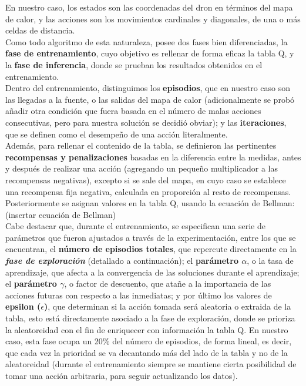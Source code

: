 En nuestro caso, los estados son las coordenadas del dron en términos del mapa de calor, y las acciones son los movimientos cardinales y diagonales, de una o más celdas de distancia.\\

Como todo algoritmo de esta naturaleza, posee dos fases bien diferenciadas, la \textbf{fase de entrenamiento}, cuyo objetivo es rellenar de forma eficaz la tabla Q, y la \textbf{fase de inferencia}, donde se prueban los resultados obtenidos en el entrenamiento.\\

Dentro del entrenamiento, distinguimos los \textbf{episodios}, que en nuestro caso son las llegadas a la fuente, o las salidas del mapa de calor (adicionalmente se probó añadir otra condición que fuera basada en el número de malas acciones consecutivas, pero para nuestra solución se decidió obviar); y las \textbf{iteraciones}, que se definen como el desempeño de una acción literalmente.\\

Además, para rellenar el contenido de la tabla, se definieron las pertinentes \textbf{recompensas y penalizaciones} basadas en la diferencia entre la medidas, antes y después de realizar una acción (agregando un pequeño multiplicador a las recompensas negativas), excepto si se sale del mapa, en cuyo caso se establece una recompensa fija negativa, calculada en proporción al resto de recompensas. Posteriormente se asignan valores en la tabla Q, usando la ecuación de Bellman:\\

(insertar ecuación de Bellman)\\

Cabe destacar que, durante el entrenamiento, se especifican una serie de parámetros que fueron ajustados a través de la experimentación, entre los que se encuentran, el \textbf{número de episodios totales}, que repercute directamente en la \textbf{\emph{fase de exploración}} (detallado a continuación); el \textbf{parámetro $\alpha$}, o la tasa de aprendizaje, que afecta a la convergencia de las soluciones durante el aprendizaje; el \textbf{parámetro $\gamma$}, o factor de descuento, que atañe a la importancia de las acciones futuras con respecto a las inmediatas; y por último los valores de \textbf{epsilon ($\epsilon$)}, que determinan si la acción tomada será aleatoria o extraida de la tabla, esto está directamente asociado a la fase de exploración, donde se prioriza la aleatoreidad con el fin de enriquecer con información la tabla Q. En nuestro caso, esta fase ocupa un 20\% del número de episodios, de forma lineal, es decir, que cada vez la prioridad se va decantando más del lado de la tabla y no de la aleatoreidad (durante el entrenamiento siempre se mantiene cierta posibilidad de tomar una acción arbitraria, para seguir actualizando los datos).\\

